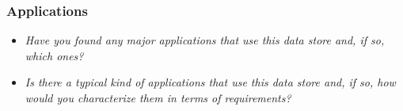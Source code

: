 
\begin{frame}
\frametitle{Applications}
\begin{itemize}
\item \emph{Have you found any major applications that use this data store and, if so, which ones?}
\item \emph{Is there a typical kind of applications that use this data store and, if so, how would you characterize them in terms of requirements?}
\end{itemize}
\end{frame} 